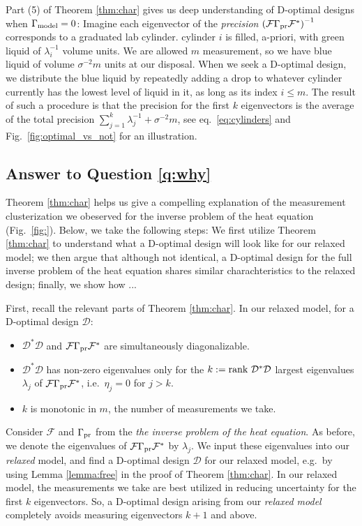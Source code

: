 \documentclass[ba]{imsart}
\newcommand{\fwd}{\mathcal{F}}
\newcommand{\rank}{\textup{rank}\ }
\newcommand{\opt}{\mathcal{D}}
\theoremstyle{plain}
\theoremstyle{definition}
\theoremstyle{remark}
\begin{document}
Part (5) of Theorem \ref{thm:char} gives us deep understanding of
D-optimal designs when $\Gamma_{\textup{model}} = 0$: Imagine each eigenvector of the
\emph{precision} $\left(\fwd \prcov \fwd^*\right )^{-1}$ corresponds
to a graduated lab cylinder. cylinder $i$ is filled, a-priori, with green liquid of
$\lambda_i^{-1}$ volume units. We are allowed $m$ measurement, so we
have blue liquid of volume $\sigma^{-2}m$ units at our disposal. When
we seek a D-optimal design, we distribute the blue liquid by
repeatedly adding a drop to whatever cylinder currently has the lowest
level of liquid in it, as long as its index $i \leq m$. The result of
such a procedure is that the precision for the first $k$ eigenvectors
is the average of the total precision $\sum_{j=1}^k \lambda_j^{-1} +
\sigma^{-2}m$, see eq.~\eqref{eq:cylinders} and
Fig.~\ref{fig:optimal_vs_not} for an illustration.




\subsection{Answer to Question \ref{q:why}}\label{subsec:why}
Theorem \ref{thm:char} helps us give a compelling explanation of the
measurement clusterization we obeserved for the inverse problem of the
heat equation (Fig.~\ref{fig:}). Below, we take the following steps:
We first utilize Theorem \ref{thm:char} to understand what a D-optimal
design will look like for our relaxed model; we then argue that
although not identical, a D-optimal design for the full inverse
problem of the heat equation shares similar charachteristics to the
relaxed design; finally, we show how ...

First, recall the relevant parts of Theorem \ref{thm:char}. In our
relaxed model, for a D-optimal design $\opt$:
\begin{itemize}
  \item $\opt^*\opt$ and $\fwd\prcov \fwd^*$ are simultaneously
    diagonalizable.
  \item $\opt^*\opt$ has non-zero eigenvalues only for the $k:=\rank
    \opt^*\opt$ largest eigenvalues $\lambda_j$ of $\fwd\prcov\fwd^*$,
    i.e.~$\eta_j=0$ for $j>k$.
  \item $k$ is monotonic in $m$, the number of measurements we take.
\end{itemize}

Consider $\fwd$ and $\Gamma_{\textup{pr}}$ from the \emph{the inverse problem of the
heat equation}. As before, we denote the eigenvalues of
$\fwd\prcov\fwd^*$ by $\lambda_j$. We input these eigenvalues into our
\emph{relaxed} model, and find a D-optimal design $\opt$ for our
relaxed model, e.g.~by using Lemma \ref{lemma:free} in the proof of
Theorem \ref{thm:char}. In our relaxed model, the measurements we take
are best utilized in reducing uncertainty for the first $k$
eigenvectors. So, a D-optimal design arising from our \emph{relaxed
model} completely avoids measuring eigenvectors $k+1$ and above.
\end{document}
